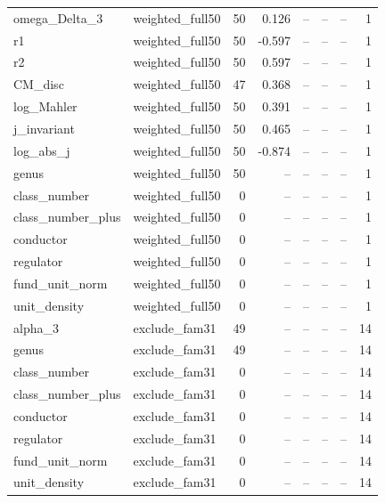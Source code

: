 \begin{tabular}{llrrrrrr}
omega\_Delta\_3 & weighted\_full50 & 50 & 0.126 & -- & -- & -- & 1 \\
r1 & weighted\_full50 & 50 & -0.597 & -- & -- & -- & 1 \\
r2 & weighted\_full50 & 50 & 0.597 & -- & -- & -- & 1 \\
CM\_disc & weighted\_full50 & 47 & 0.368 & -- & -- & -- & 1 \\
log\_Mahler & weighted\_full50 & 50 & 0.391 & -- & -- & -- & 1 \\
j\_invariant & weighted\_full50 & 50 & 0.465 & -- & -- & -- & 1 \\
log\_abs\_j & weighted\_full50 & 50 & -0.874 & -- & -- & -- & 1 \\
genus & weighted\_full50 & 50 & -- & -- & -- & -- & 1 \\
class\_number & weighted\_full50 & 0 & -- & -- & -- & -- & 1 \\
class\_number\_plus & weighted\_full50 & 0 & -- & -- & -- & -- & 1 \\
conductor & weighted\_full50 & 0 & -- & -- & -- & -- & 1 \\
regulator & weighted\_full50 & 0 & -- & -- & -- & -- & 1 \\
fund\_unit\_norm & weighted\_full50 & 0 & -- & -- & -- & -- & 1 \\
unit\_density & weighted\_full50 & 0 & -- & -- & -- & -- & 1 \\
alpha\_3 & exclude\_fam31 & 49 & -- & -- & -- & -- & 14 \\
genus & exclude\_fam31 & 49 & -- & -- & -- & -- & 14 \\
class\_number & exclude\_fam31 & 0 & -- & -- & -- & -- & 14 \\
class\_number\_plus & exclude\_fam31 & 0 & -- & -- & -- & -- & 14 \\
conductor & exclude\_fam31 & 0 & -- & -- & -- & -- & 14 \\
regulator & exclude\_fam31 & 0 & -- & -- & -- & -- & 14 \\
fund\_unit\_norm & exclude\_fam31 & 0 & -- & -- & -- & -- & 14 \\
unit\_density & exclude\_fam31 & 0 & -- & -- & -- & -- & 14 \\
\hline
\end{tabular}
